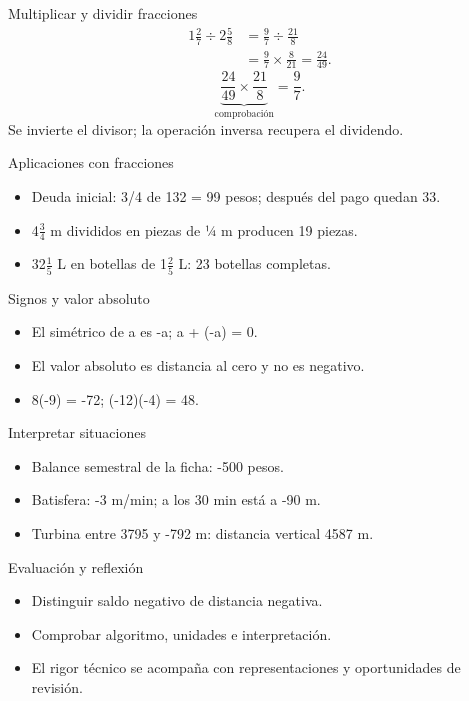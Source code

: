 \documentclass[
	spanish,
	aspectratio=1610,
	xcolor={dvipsnames,table}
]{beamer}
\begin{document}
\begin{frame}{Multiplicar y dividir fracciones}
\fontsize{14}{18}\selectfont\begin{align*}1\frac27\div2\frac58&=\frac97\div\frac{21}{8}\\&=\frac97\times\frac8{21}=\frac{24}{49}.\end{align*}
\[\underbrace{\frac{24}{49}\times\frac{21}{8}}_{\text{comprobación}}=\frac97.\]
\centering Se invierte el divisor; la operación inversa recupera el dividendo.
\end{frame}
\begin{frame}{Aplicaciones con fracciones}
\fontsize{14}{18}\selectfont\begin{itemize}\setlength{\itemsep}{.45cm}
\item Deuda inicial: 3/4 de 132 = 99 pesos; después del pago quedan 33.
\item 4$\frac34$ m divididos en piezas de ¼ m producen 19 piezas.
\item 32$\frac15$ L en botellas de 1$\frac25$ L: 23 botellas completas.
\end{itemize}
\end{frame}
\begin{frame}{Signos y valor absoluto}
\fontsize{14}{18}\selectfont\begin{itemize}\setlength{\itemsep}{.45cm}
\item El simétrico de a es -a; a + (-a) = 0.
\item El valor absoluto es distancia al cero y no es negativo.
\item 8(-9) = -72; (-12)(-4) = 48.
\end{itemize}
\end{frame}
\begin{frame}{Interpretar situaciones}
\fontsize{14}{18}\selectfont\begin{itemize}\setlength{\itemsep}{.45cm}
\item Balance semestral de la ficha: -500 pesos.
\item Batisfera: -3 m/min; a los 30 min está a -90 m.
\item Turbina entre 3795 y -792 m: distancia vertical 4587 m.
\end{itemize}
\end{frame}
\begin{frame}{Evaluación y reflexión}
\fontsize{14}{18}\selectfont\begin{itemize}\setlength{\itemsep}{.45cm}
\item Distinguir saldo negativo de distancia negativa.
\item Comprobar algoritmo, unidades e interpretación.
\item El rigor técnico se acompaña con representaciones y oportunidades de revisión.
\end{itemize}
\end{frame}
\end{document}

